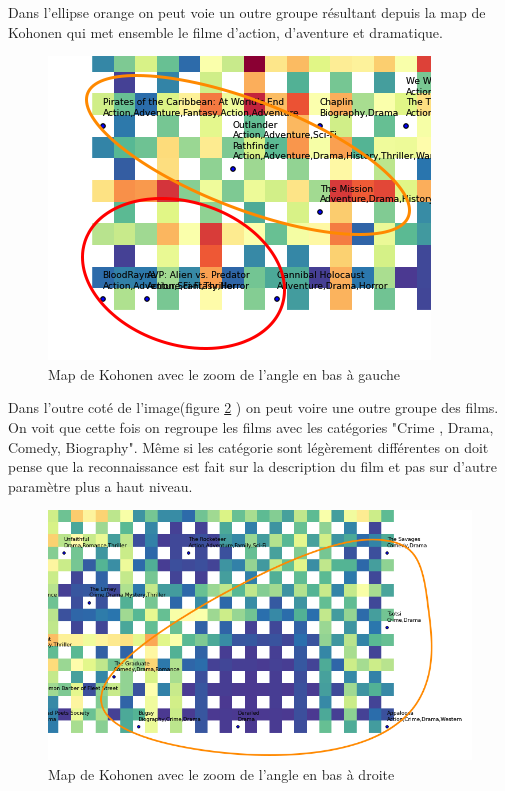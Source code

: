 Dans l'ellipse orange on peut voie un outre groupe résultant depuis la map de Kohonen qui met ensemble le filme d'action, d'aventure et dramatique.
\begin{figure}[h]
	\centering
	\includegraphics[width=0.5\linewidth]{img/map1zoom2.png}
	\caption{Map de Kohonen avec le zoom de l'angle en bas à gauche}
	\label{map1zoom2}
\end{figure}

Dans l'outre coté de l'image(figure \ref{map1zoom3} ) on peut voire une outre groupe des films. On voit que cette fois on regroupe les films avec les catégories "Crime , Drama, Comedy, Biography". Même si les catégorie sont légèrement différentes on doit pense que la reconnaissance est fait sur la description du film et pas sur d'autre paramètre plus a haut niveau.

\begin{figure}[h]
\centering
\includegraphics[width=0.6\linewidth]{img/map1zoom3.png}
\caption{Map de Kohonen avec le zoom de l'angle en bas à droite}
\label{map1zoom3}
\end{figure}




